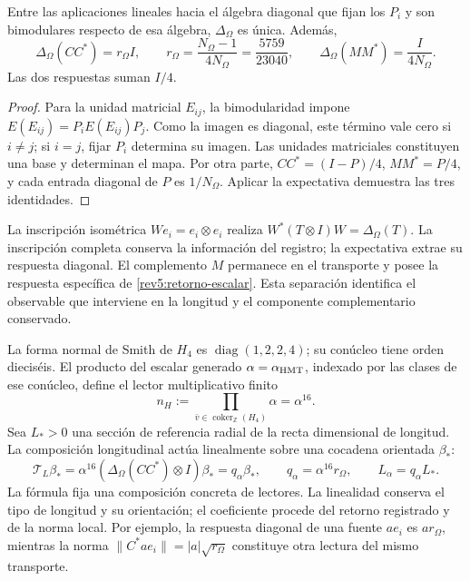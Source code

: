 \begin{proposition}
\label{rev5:retorno}
Entre las aplicaciones lineales hacia el álgebra diagonal que fijan
los \(P_i\) y son bimodulares respecto de esa álgebra,
\(\Delta_\Omega\) es única. Además,
\begin{equation}
 \Delta_\Omega(CC^*)=r_\Omega I,
 \qquad r_\Omega=\frac{N_\Omega-1}{4N_\Omega}
 =\frac{5759}{23040},
 \qquad \Delta_\Omega(MM^*)=\frac{I}{4N_\Omega}.
 \label{rev5:retorno-escalar}
\end{equation}
Las dos respuestas suman \(I/4\).
\end{proposition}
\begin{proof}
Para la unidad matricial \(E_{ij}\), la bimodularidad impone
\(E(E_{ij})=P_iE(E_{ij})P_j\). Como la imagen es diagonal,
este término vale cero si \(i\ne j\); si \(i=j\), fijar
\(P_i\) determina su imagen. Las unidades matriciales constituyen
una base y determinan el mapa. Por otra parte,
\(CC^*=(I-P)/4\), \(MM^*=P/4\), y cada entrada diagonal
de \(P\) es \(1/N_\Omega\). Aplicar la expectativa demuestra
las tres identidades.
\end{proof}

La inscripción isométrica \(We_i=e_i\otimes e_i\) realiza
\(W^*(T\otimes I)W=\Delta_\Omega(T)\). La inscripción
completa conserva la información del registro; la expectativa extrae
su respuesta diagonal. El complemento \(M\) permanece en el
transporte y posee la respuesta específica de
\eqref{rev5:retorno-escalar}. Esta separación identifica el observable
que interviene en la longitud y el componente complementario conservado.

La forma normal de Smith de \(H_4\) es
\(\operatorname{diag}(1,2,2,4)\); su conúcleo tiene orden
dieciséis. El producto del escalar generado
\(\alpha=\alpha_{\rm HMT}\), indexado por las clases de ese
conúcleo, define el lector multiplicativo finito
\[
 n_H:=\prod_{\bar v\in\operatorname{coker}_{\mathbb Z}(H_4)}
 \alpha=\alpha^{16}.
\]
Sea \(L_*>0\) una sección de referencia
radial de la recta dimensional de longitud. La composición longitudinal
actúa linealmente sobre una cocadena orientada \(\beta_*\):
\begin{equation}
 \mathscr T_L\beta_*
 =\alpha^{16}(\Delta_\Omega(CC^*)\otimes I)\beta_*
 =q_\alpha\beta_*,\qquad
 q_\alpha=\alpha^{16}r_\Omega,\qquad
 L_\alpha=q_\alpha L_*.
 \label{rev5:longitud-generada}
\end{equation}
La fórmula fija una composición concreta de lectores. La linealidad
conserva el tipo de longitud y su orientación; el coeficiente procede
del retorno registrado y de la norma local. Por ejemplo, la respuesta
diagonal de una fuente \(a e_i\) es \(a r_\Omega\), mientras
la norma \(\|C^*ae_i\|=|a|\sqrt{r_\Omega}\) constituye
otra lectura del mismo transporte.

